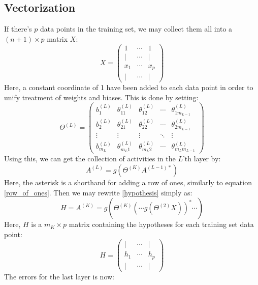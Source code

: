 \documentclass[12pt, a4paper]{article}
\numberwithin{equation}{section}
\begin{document}
\subsection{Vectorization}
If there's $p$ data points in the training set, we may collect them all into a $(n+1)\times p$ matrix $X$:
\begin{equation}
\label{row_of_ones}
X=
\begin{pmatrix}
1	&	\cdots	& 1	\\
|	&	\cdots	& |	\\
x_1	&	\cdots	& x_p \\
|	&	\cdots	& |
\end{pmatrix}
\end{equation}
Here, a constant coordinate of 1 have been added to each data point in order to unify treatment of weights and biases. This is done by setting:
\begin{equation}
\Theta^{(L)}=
\begin{pmatrix}
b^{(L)}_1		& \theta^{(L)}_{11}	& \theta^{(L)}_{12}	& \cdots	& \theta^{(L)}_{1m_{L-1}} \\
b^{(L)}_2		& \theta^{(L)}_{21}	& \theta^{(L)}_{22}	& \cdots 	& \theta^{(L)}_{2m_{L-1}} \\
\vdots			& \vdots		& \vdots		& \ddots 	& \vdots \\
b^{(L)}_{m_L}	& \theta^{(L)}_{m_L1}	& \theta^{(L)}_{m_L2}	& \cdots	& \theta^{(L)}_{m_Lm_{L-1}}
\end{pmatrix}
\end{equation}
Using this, we can get the collection of activities in the $L$'th layer by:
\begin{equation}
A^{(L)}=g(\Theta^{(K)}A^{(L-1)*})
\end{equation}
Here, the asterisk is a shorthand for adding a row of ones, similarly to equation \ref{row_of_ones}. Then we may rewrite \ref{hypothesis} simply as:
\begin{equation}
H=A^{(K)}=g\left(\Theta^{(K)}\left(\cdots g(\Theta^{(2)}X)\right)^*\cdots\right)
\end{equation}
Here, $H$ is a $m_K\times p$ matrix containing the hypotheses for each training set data point:
\begin{equation}
H=
\begin{pmatrix}
|	&	\cdots	& |	\\
h_1	&	\cdots	& h_p \\
|	&	\cdots	& |
\end{pmatrix}
\end{equation}
The errors for the last layer is now:
\end{document}
